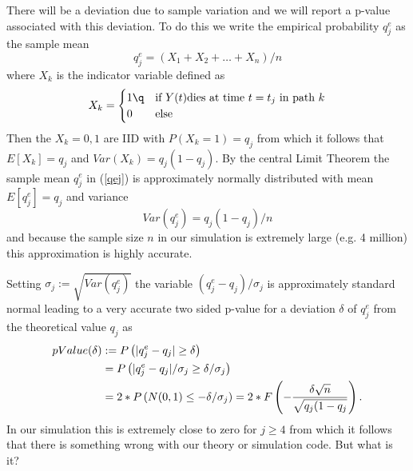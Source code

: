 There will be a deviation due to sample variation and we will report a p-value
associated with this deviation. To do this we write the empirical probability
$q^e_j$ as the sample mean
%
\begin{equation}
\label{qej}
q^e_j=(X_1+X_2+\dots+X_n)/n
\end{equation}
%
where $X_k$ is the indicator variable defined as
$$
X_k=
\begin{cases}
1\q&\text{if }Y(t)\text{dies at time $t=t_j$ in path $k$}\\
0 &\text{else}
\end{cases}
$$
Then the $X_k=0,1$ are IID with $P(X_k=1)=q_j$ from which it follows that
$E[X_k]=q_j$ and $Var(X_k)=q_j(1-q_j)$. By the central Limit Theorem the sample
mean $q^e_j$ in (\ref{qej}) is approximately normally distributed with mean
$E[q^e_j]=q_j$ and variance 
$$
Var(q^e_j)=q_j(1-q_j)/n
$$ 
and because the sample 
size $n$ in our simulation is extremely large (e.g. 4 million) this 
approximation is highly accurate.

Setting $\sigma_j:=\sqrt{Var(q^e_j)}$ the variable $(q^e_j-q_j)/\sigma_j$ is
approximately standard normal leading to a very accurate two sided 
p-value for a deviation $\delta$ of $q^e_j$ from the theoretical value $q_j$
as
%
\begin{align}
\notag
pValue(\delta)&:=
P\left(|q^e_j-q_j|\geq\delta\right)\\\notag&=
P\left(|q^e_j-q_j|/\sigma_j\geq\delta/\sigma_j\right)\\\label{pValue}&=
2*P\left(N(0,1)\leq-\delta/\sigma_j\right)=
2*F\left(-\frac{\delta\sqrt n}{\sqrt{q_j(1-q_j}}\right).
\end{align}
%
In our simulation this is extremely close to zero for $j\geq 4$ from which it 
follows that there is something wrong with our theory or simulation code. 
But what is it?
